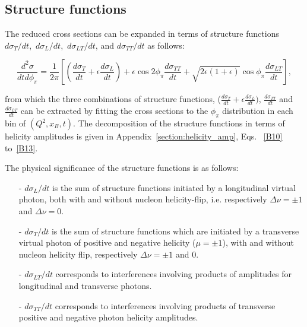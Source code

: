 \documentclass[prc,floatfix,twocolumn,superscriptaddress,letter]{revtex4}
\begin{document}
\subsection{Structure functions  }
The reduced cross sections can be expanded in terms of  structure functions 
$d\sigma_T/dt$,\  $d\sigma_L/dt$,\ $d\sigma_{LT}/dt$, and $d\sigma_{TT}/dt$ as follows:

\begin{widetext}
\begin{equation}
\frac{d^2\sigma}{dtd\phi_\pi} = \frac{1}{2\pi} 
\left [\left( \frac{d\sigma_T}{dt}+\epsilon\frac{d\sigma_L}{dt}\right) 
+ \epsilon \cos 2 \phi_\pi \frac{d\sigma_{TT}}{dt} + 
\sqrt{2\epsilon(1+\epsilon)} \cos \phi_\pi \frac{d\sigma_{LT}}{dt} \right],
\label{eq:sigmaphidep}
\end{equation}
\end{widetext}

\noindent
from which the three combinations of structure functions, ($\frac{d\sigma_T}{dt}+\epsilon\frac{d\sigma_L}{dt})$,
$\frac{d\sigma_{TT}}{dt}$ and 
$\frac{d\sigma_{LT}}{dt}$ can be extracted by fitting the cross sections to the $\phi_\pi$ distribution in each bin of $(Q^2,x_B,t)$.
The decomposition of the structure functions in terms of helicity amplitudes is given in Appendix~\ref{section:helicity_amp}, Eqs. ~\ref{B10} to~\ref{B13}.

The physical significance of the structure functions is as follows:
\begin{itemize}
\item[-] $d\sigma_L/dt$  is the sum of structure functions  initiated by a longitudinal virtual photon, both with and without nucleon helicity-flip, i.e. respectively $\Delta \nu = \pm 1$ and $\Delta \nu = 0$.

\item[-] $d\sigma_T/dt$ is the sum of structure functions which are initiated by a transverse virtual photon of positive and negative helicity ($\mu = \pm 1$), with and without nucleon helicity flip, respectively $\Delta \nu = \pm 1$ and  $0$.

\item[-] $d\sigma_{LT}/dt$ corresponds to interferences involving products  of amplitudes for longitudinal and transverse photons.

\item[-] $d\sigma_{TT}/dt$ corresponds to interferences involving products  of transverse positive and negative photon helicity amplitudes.

\end{itemize}
\end{document}
